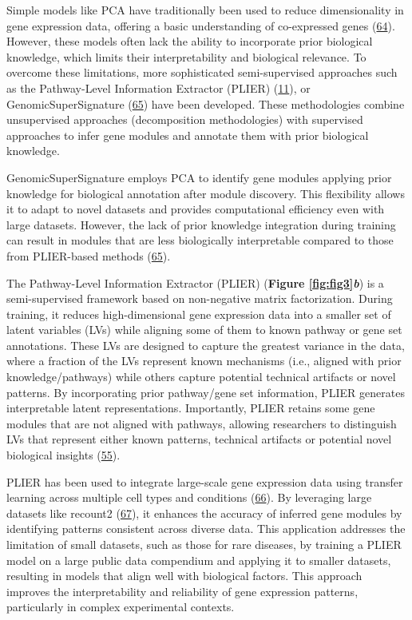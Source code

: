 Simple models like PCA have traditionally been used to reduce dimensionality in gene expression data, offering a basic understanding of co-expressed genes (\protect\hyperlink{ref-1703M7bru}{64}).
However, these models often lack the ability to incorporate prior biological knowledge, which limits their interpretability and biological relevance.
To overcome these limitations, more sophisticated semi-supervised approaches such as the Pathway-Level Information Extractor (PLIER) (\protect\hyperlink{ref-Ki2ij7zE}{11}), or GenomicSuperSignature (\protect\hyperlink{ref-X4fhSCkz}{65}) have been developed.
These methodologies combine unsupervised approaches (decomposition methodologies) with supervised approaches to infer gene modules and annotate them with prior biological knowledge.

GenomicSuperSignature employs PCA to identify gene modules applying prior knowledge for biological annotation after module discovery.
This flexibility allows it to adapt to novel datasets and provides computational efficiency even with large datasets.
However, the lack of prior knowledge integration during training can result in modules that are less biologically interpretable compared to those from PLIER-based methods (\protect\hyperlink{ref-X4fhSCkz}{65}).

The Pathway-Level Information Extractor (PLIER) (\textbf{Figure \ref{fig:fig3}\emph{b}}) is a semi-supervised framework based on non-negative matrix factorization.
During training, it reduces high-dimensional gene expression data into a smaller set of latent variables (LVs) while aligning some of them to known pathway or gene set annotations.
These LVs are designed to capture the greatest variance in the data, where a fraction of the LVs represent known mechanisms (i.e., aligned with prior knowledge/pathways) while others capture potential technical artifacts or novel patterns.
By incorporating prior pathway/gene set information, PLIER generates interpretable latent representations.
Importantly, PLIER retains some gene modules that are not aligned with pathways, allowing researchers to distinguish LVs that represent either known patterns, technical artifacts or potential novel biological insights (\protect\hyperlink{ref-dg9nKuy0}{55}).

PLIER has been used to integrate large-scale gene expression data using transfer learning across multiple cell types and conditions (\protect\hyperlink{ref-14rnBunuZ}{66}).
By leveraging large datasets like recount2 (\protect\hyperlink{ref-6SPTvFXq}{67}), it enhances the accuracy of inferred gene modules by identifying patterns consistent across diverse data.
This application addresses the limitation of small datasets, such as those for rare diseases, by training a PLIER model on a large public data compendium and applying it to smaller datasets, resulting in models that align well with biological factors.
This approach improves the interpretability and reliability of gene expression patterns, particularly in complex experimental contexts.

